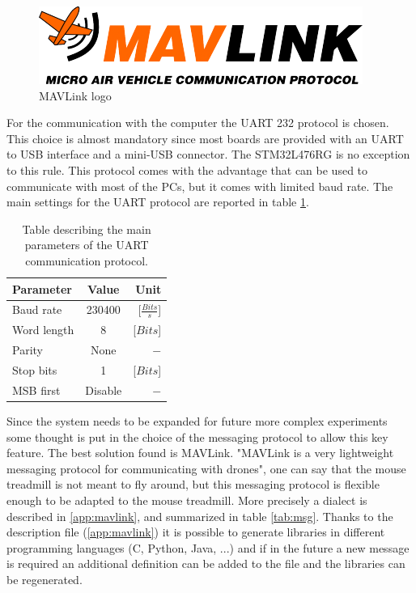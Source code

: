 \documentclass[12pt,a4paper, twoside]{article}
\begin{document}
\begin{figure}
	\includegraphics[width=\linewidth]{fig/MAVLink_logo.png}
	\caption{MAVLink logo}\label{fig:MAVLink_logo}
\end{figure}
For the communication with the computer the UART 232 protocol is chosen. This choice is almost mandatory since most boards are provided with an UART to USB interface and a mini-USB connector. The STM32L476RG is no exception to this rule. This protocol comes with the advantage that can be used to communicate with most of the PCs, but it comes with limited baud rate. The main settings for the UART protocol are reported in table \ref{tab:UART}.

\begin{table}[H]
	\centering
	\begin{tabular}{l||c|r} 
		\textbf{Parameter} &\textbf{Value} &\textbf{Unit}\\ 
		\hline
		\hline 
		Baud rate & 230400 & [$\frac{Bits}{s}$] \\ 
		\hline 
		Word length & 8 & [$Bits$] \\ 
		\hline 
		Parity & None & $-$\\ 
		\hline 
		Stop bits & 1 & [$Bits$]\\ 
		\hline 
		MSB first & Disable & $-$  \\ 
	\end{tabular} 
	\caption[UART communication parameters]{Table describing the main parameters of the UART communication protocol.}
	\label{tab:UART}
\end{table}

Since the system needs to be expanded for future more complex experiments some thought is put in the choice of the messaging protocol to allow this key feature.
The best solution found is MAVLink. "MAVLink is a very lightweight messaging protocol for communicating with drones"\cite{mavlink}, one can say that the mouse treadmill is not meant to fly around, but this messaging protocol is flexible enough to be adapted to the mouse treadmill.
More precisely a dialect is described in \ref{app:mavlink}, and summarized in table \ref{tab:msg}. Thanks to the description file (\ref{app:mavlink}) it is possible to generate libraries in different programming languages (C, Python, Java, ...) and if in the future a new message is required an additional definition can be added to the file and the libraries can be regenerated.
\end{document}
